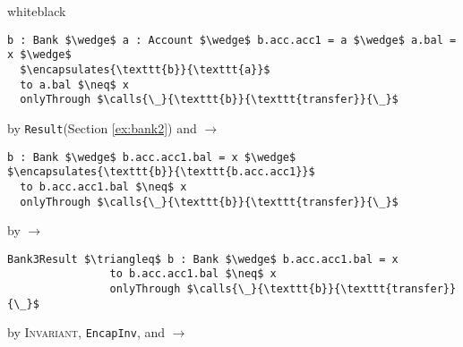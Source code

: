 \begin{proofBox}{white}{black}
\footnotesize
\begin{minipage}{0.75\textwidth}
\begin{lstlisting}[language = Chainmail, mathescape=true, frame=single]
b : Bank $\wedge$ a : Account $\wedge$ b.acc.acc1 = a $\wedge$ a.bal = x $\wedge$ 
  $\encapsulates{\texttt{b}}{\texttt{a}}$
  to a.bal $\neq$ x
  onlyThrough $\calls{\_}{\texttt{b}}{\texttt{transfer}}{\_}$
\end{lstlisting}
\end{minipage}
\begin{minipage}{0.24\textwidth}
\scriptsize
\hfill by \texttt{Result}(Section \ref{ex:bank2}) and $\longrightarrow$
\end{minipage}
\begin{minipage}{0.75\textwidth}
\begin{lstlisting}[language = Chainmail, mathescape=true]
b : Bank $\wedge$ b.acc.acc1.bal = x $\wedge$ $\encapsulates{\texttt{b}}{\texttt{b.acc.acc1}}$
  to b.acc.acc1.bal $\neq$ x
  onlyThrough $\calls{\_}{\texttt{b}}{\texttt{transfer}}{\_}$
\end{lstlisting}
\end{minipage}
\begin{minipage}{0.24\textwidth}
\scriptsize
\hfill by $\longrightarrow$
\end{minipage}
\begin{minipage}{0.75\textwidth}
\begin{lstlisting}[language = Chainmail, mathescape=true]
Bank3Result $\triangleq$ b : Bank $\wedge$ b.acc.acc1.bal = x
                to b.acc.acc1.bal $\neq$ x
                onlyThrough $\calls{\_}{\texttt{b}}{\texttt{transfer}}{\_}$
\end{lstlisting}
\end{minipage}
\begin{minipage}{0.24\textwidth}
\scriptsize
\hfill by \textsc{Invariant}, \texttt{EncapInv}, and $\longrightarrow$
\end{minipage}
\end{proofBox}

\newpage



